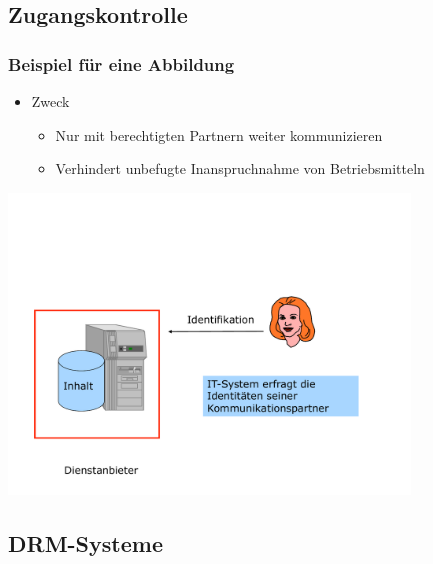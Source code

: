 \subsection{Zugangskontrolle} %
\begin{frame}
	\frametitle{Beispiel für eine Abbildung}
	\begin{itemize}
		\item Zweck
			\begin{itemize}
				\item Nur mit \alert{berechtigten Partnern} weiter kommunizieren
				\item Verhindert unbefugte Inanspruchnahme von Betriebsmitteln
			\end{itemize}
	\end{itemize}
	\vspace{\fill}
	\pause %
	\begin{center}
		\includegraphics[width=0.8\textwidth]{pic/abbildung1.pdf}
	\end{center}
\end{frame}

\subsection{DRM-Systeme} %

